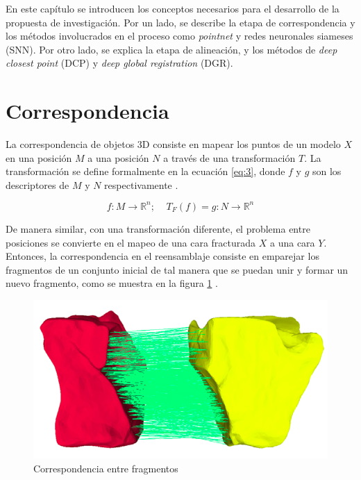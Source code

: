
En este capítulo se introducen los conceptos necesarios para el desarrollo de la propuesta de investigación. Por un lado, se describe la etapa de  correspondencia y los métodos involucrados en el proceso como \textit{pointnet} y redes neuronales siameses (SNN). Por otro lado, se explica la etapa de alineación, y los métodos de \textit{deep closest point} (DCP) y \textit{deep global registration} (DGR).

\section{Correspondencia}

La correspondencia de objetos 3D consiste en mapear los puntos de un modelo $X$ en una posición $M$ a una posición $N$ a través de una transformación $T$. La transformación se define formalmente en la ecuación \ref{eq:3}, donde $f$ y $g$ son los descriptores de $M$ y $N$ respectivamente \cite{17}.

\begin{equation} \label{eq:3}
    f:M \xrightarrow{} \mathbb{R}^n; \ \ \ \ \ T_F (f) = g:N \xrightarrow{} \mathbb{R}^n
\end{equation}

De manera similar, con una transformación diferente, el problema entre posiciones se convierte en el mapeo de una cara fracturada $X$ a una cara $Y$. Entonces, la correspondencia en el reensamblaje consiste en emparejar los fragmentos de un conjunto inicial de tal manera que se puedan unir y formar un nuevo fragmento, como se muestra en la figura \ref{fig:correspondencia} \cite{2}. 

\begin{figure}[!h]
    \centering
     \includegraphics[scale=0.18]{images/correspondencia.png}
    \caption{Correspondencia entre fragmentos \cite{5}}
    \label{fig:correspondencia}
\end{figure}

